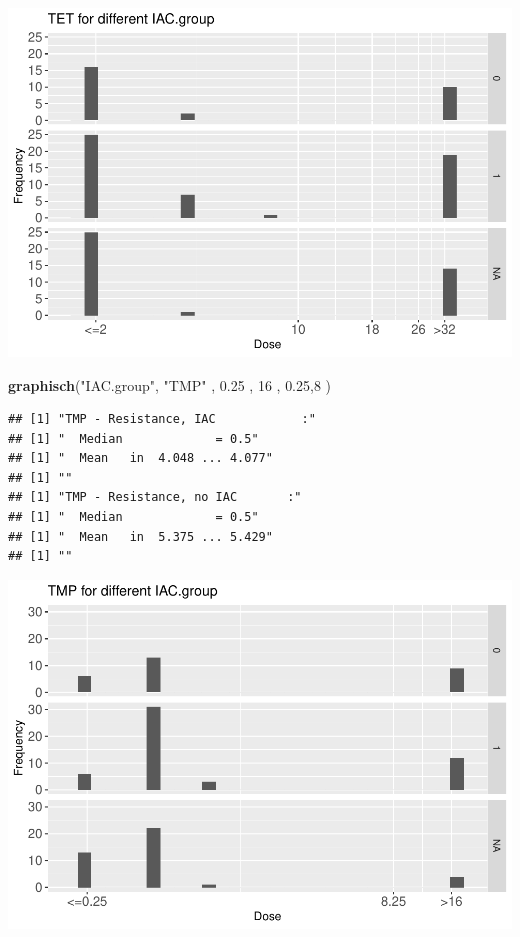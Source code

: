 \documentclass[
]{article}
\newenvironment{Shaded}{\begin{snugshade}}{\end{snugshade}}
\newcommand{\DecValTok}[1]{\textcolor[rgb]{0.00,0.00,0.81}{#1}}
\newcommand{\FloatTok}[1]{\textcolor[rgb]{0.00,0.00,0.81}{#1}}
\newcommand{\KeywordTok}[1]{\textcolor[rgb]{0.13,0.29,0.53}{\textbf{#1}}}
\newcommand{\NormalTok}[1]{#1}
\newcommand{\StringTok}[1]{\textcolor[rgb]{0.31,0.60,0.02}{#1}}
\begin{document}
\includegraphics{Verteilungen_files/figure-latex/unnamed-chunk-15-1.pdf}

\begin{Shaded}
\begin{Highlighting}[]
   \KeywordTok{graphisch}\NormalTok{(}\StringTok{"IAC.group"}\NormalTok{, }\StringTok{"TMP"}\NormalTok{ , }\FloatTok{0.25}\NormalTok{ ,  }\DecValTok{16}\NormalTok{   ,   }\FloatTok{0.25}\NormalTok{,}\DecValTok{8}\NormalTok{    ) }
\end{Highlighting}
\end{Shaded}

\begin{verbatim}
## [1] "TMP - Resistance, IAC            :"
## [1] "  Median             = 0.5"
## [1] "  Mean   in  4.048 ... 4.077"
## [1] ""
## [1] "TMP - Resistance, no IAC       :"
## [1] "  Median             = 0.5"
## [1] "  Mean   in  5.375 ... 5.429"
## [1] ""
\end{verbatim}

\includegraphics{Verteilungen_files/figure-latex/unnamed-chunk-16-1.pdf}
\end{document}
